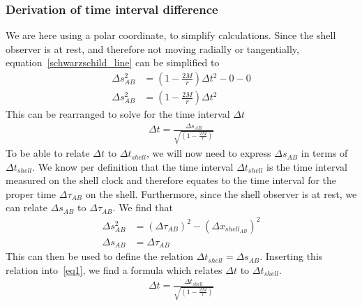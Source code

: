 \documentclass[reprint,english,notitlepage]{revtex4-2}
\begin{document}
        \subsubsection{Derivation of time interval difference}\label{subsec:derivation-of-time-interval-difference}
            We are here using a polar coordinate, to simplify calculations.
            Since the shell observer is at rest, and therefore not moving radially or tangentially, equation~\eqref{schwarzschild_line} can be simplified to
            \begin{align}
                \Delta s^2_{AB} &= \left(1-\frac{2M}{r}\right) \Delta t^2 - 0 - 0\\
                \Delta s^2_{AB} &= \left(1-\frac{2M}{r}\right) \Delta t^2
            \end{align}
            This can be rearranged to solve for the time interval $\Delta t$
            \begin{align}
                \Delta t = \frac{\Delta s_{AB}}{\sqrt{\left(1-\frac{2M}{r}\right)}} \label{eq1}
            \end{align}
            To be able to relate $\Delta t$ to $\Delta t_{shell}$, we will now need to express $\Delta s_{AB}$ in terms of $\Delta t_{shell}$.
            We know per definition that the time interval $\Delta t_{shell}$ is the time interval measured on the shell clock and therefore equates to the time interval for the proper time $\Delta \tau_{AB}$ on the shell.
            Furthermore, since the shell observer is at rest, we can relate $\Delta s_{AB}$ to $\Delta \tau_{AB}$.
            We find that
            \begin{align}
                \Delta s^2_{AB} &= (\Delta \tau_{AB})^2 - (\Delta x_{shell}_{AB})^2\\
                \Delta s_{AB} &= \Delta \tau_{AB}
            \end{align}
            This can then be used to define the relation $\Delta t_{shell} = \Delta s_{AB}$.
            Inserting this relation into~\eqref{eq1}, we find a formula which relates $\Delta t$ to $\Delta t_{shell}$.
            \begin{align}
                \Delta t = \frac{\Delta t_{shell}}{\sqrt{\left(1-\frac{2M}{r}\right)}}
            \end{align}
\end{document}
